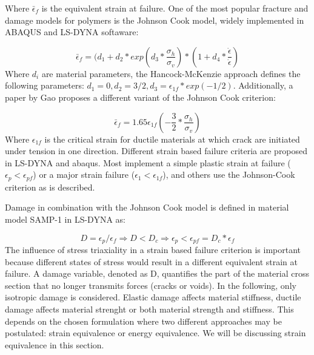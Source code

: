 Where $\bar\epsilon_f$ is the equivalent strain at failure. 
One of the most popular fracture and damage models for polymers is the Johnson Cook model, widely implemented in ABAQUS and LS-DYNA softaware:

\begin{equation}\label{AzziTsai}
\bar\epsilon_f=(d_1+d_2*exp{(d_3*\frac{\sigma_h}{\sigma_v})}*(1+d_4*\frac{\dot{\epsilon}}{\dot{\epsilon}})
\end{equation}
Where $d_i$ are material parameters\cite{BoisA:}, the Hancock-McKenzie approach defines the following parameters: $d_1=0, d_2=3/2, d_3=\epsilon_{1f}*exp(-1/2)$. Additionally, a paper by Gao \cite{Gao2013CriticalPipelines} proposes a different variant of the Johnson Cook criterion:

\begin{equation}\label{eqn:JC}
\bar\epsilon_{f}=1.65\epsilon_{1f}{(-\frac{3}{2}*\frac{\sigma_h}{\sigma_v})}
\end{equation}Where $\epsilon_{1f}$ is the critical strain for ductile materials at which crack are initiated under tension in one direction. Different strain based failure criteria are proposed in LS-DYNA and abaqus. Most implement a simple plastic strain at failure ($\epsilon_p<\epsilon_{pf}$) or a major strain failure ($\epsilon_1<\epsilon_{1f}$), and others use the Johnson-Cook criterion as is described.  

Damage in combination with the Johnson Cook model is defined in material model SAMP-1 in LS-DYNA as:

\begin{equation}\label{AzziTsai}
D=\epsilon_p/\epsilon_f\Rightarrow D<D_c\Rightarrow\epsilon_p<\epsilon_{pf}=D_c*\epsilon_f
\end{equation}The influence of stress triaxiality in a strain based failure criterion is important because different states of stress would result in a different equivalent strain at failure\cite{BoisA:}. 
A damage variable, denoted as D, quantifies the part of the material cross section that no longer transmits forces (cracks or voids). In the following, only isotropic damage is considered. Elastic damage affects material stiffness, ductile damage affects material strenght or both material strength and stiffness. This depends on the chosen formulation where two different approaches may be postulated: strain equivalence or energy equivalence. We will be discussing strain equivalence in this section. 

